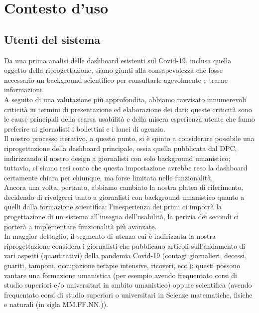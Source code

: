 \section{Contesto d'uso}
\label{s:contesto-uso}
\subsection{Utenti del sistema}
\label{ss:utenti-sistema}
Da una prima analisi delle dashboard esistenti sul Covid-19, inclusa quella oggetto della riprogettazione, siamo giunti alla consapevolezza che fosse necessario un background scientifico per consultarle agevolmente e trarne informazioni.\\
A seguito di una valutazione più approfondita, abbiamo ravvisato innumerevoli criticità in termini di presentazione ed elaborazione dei dati: queste criticità sono le cause principali della scarsa usabilità e della misera esperienza utente che  fanno preferire ai giornalisti i bollettini e i lanci di agenzia.\\
Il nostro processo iterativo, a questo punto, si è spinto a considerare possibile una riprogettazione della dashboard principale, ossia quella pubblicata dal DPC, indirizzando il nostro design a giornalisti con solo background umanistico; tuttavia, ci siamo resi conto che questa impostazione avrebbe reso la dashboard certamente chiara per chiunque, ma forse limitata nelle funzionalità.\\ 
Ancora una volta, pertanto, abbiamo cambiato la nostra platea di riferimento, decidendo di rivolgerci tanto a giornalisti con background umanistico quanto a quelli dalla formazione scientifica: l'inesperienza dei primi ci imporrà la progettazione di un sistema all'insegna dell'usabilità, la perizia dei secondi ci porterà a implementare funzionalità più avanzate.\\
In maggior dettaglio, il segmento di utenza cui è indirizzata la nostra riprogettazione considera i giornalisti che pubblicano articoli sull'andamento di vari aspetti (quantitativi) della pandemia Covid-19 (contagi giornalieri, decessi, guariti, tamponi, occupazione terapie intensive, ricoveri, ecc.): questi possono vantare una formazione umanistica (per esempio avendo frequentato corsi di studio superiori e/o universitari in ambito umanistico) oppure scientifica (avendo frequentato corsi di studio superiori o universitari in Scienze matematiche, fisiche e naturali (in sigla MM.FF.NN.)).

